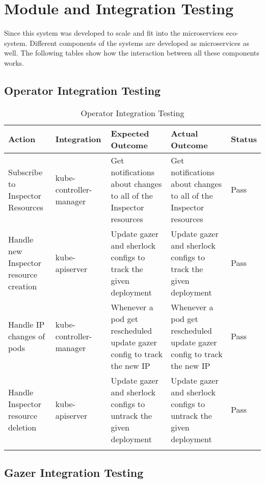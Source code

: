 \section{Module and Integration Testing}\label{sec:module-integration-testing}

Since this system was developed to scale and fit into the microservices eco-system. Different components of the systems are developed as microservices as well. The following tables show how the interaction between all these components works.

\subsection{Operator Integration Testing}

\begin{longtable}{|p{30mm}|p{21mm}|p{40mm}|p{40mm}|p{10mm}|}
    \hline
    \textbf{Action} &
    \textbf{Integration} &
    \textbf{Expected Outcome} &
    \textbf{Actual Outcome} &
    \textbf{Status} \\ \hline
    Subscribe to Inspector Resources &
    kube-controller-manager &
    Get notifications about changes to all of the Inspector resources &
    Get notifications about changes to all of the Inspector resources &
    Pass \\ \hline
    Handle new Inspector resource creation &
    kube-apiserver &
    Update \ac{gazer} and \ac{sherlock} configs to track the given deployment &
    Update \ac{gazer} and \ac{sherlock} configs to track the given deployment &
    Pass \\ \hline
    Handle IP changes of pods &
    kube-controller-manager &
    Whenever a pod get rescheduled update \ac{gazer} config to track the new IP &
    Whenever a pod get rescheduled update \ac{gazer} config to track the new IP &
    Pass \\ \hline
    Handle Inspector resource deletion &
    kube-apiserver &
    Update \ac{gazer} and \ac{sherlock} configs to untrack the given deployment &
    Update \ac{gazer} and \ac{sherlock} configs to untrack the given deployment &
    Pass \\ \hline
    \caption{Operator Integration Testing}
\end{longtable}

\subsection{Gazer Integration Testing}

